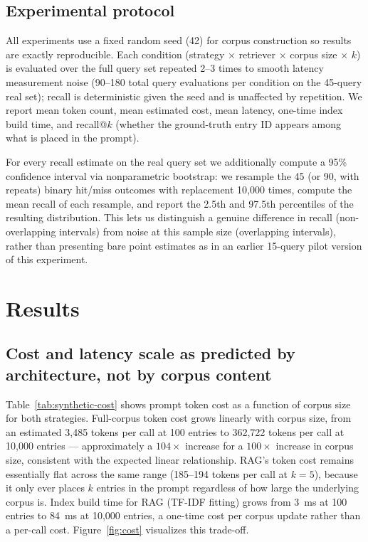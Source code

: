 \documentclass[11pt]{article}
\begin{document}
\subsection{Experimental protocol}

All experiments use a fixed random seed (42) for corpus construction so results are exactly reproducible. Each condition (strategy $\times$ retriever $\times$ corpus size $\times$ $k$) is evaluated over the full query set repeated 2--3 times to smooth latency measurement noise (90--180 total query evaluations per condition on the 45-query real set); recall is deterministic given the seed and is unaffected by repetition. We report mean token count, mean estimated cost, mean latency, one-time index build time, and recall@$k$ (whether the ground-truth entry ID appears among what is placed in the prompt).

For every recall estimate on the real query set we additionally compute a 95\% confidence interval via nonparametric bootstrap: we resample the 45 (or 90, with repeats) binary hit/miss outcomes with replacement 10{,}000 times, compute the mean recall of each resample, and report the 2.5th and 97.5th percentiles of the resulting distribution. This lets us distinguish a genuine difference in recall (non-overlapping intervals) from noise at this sample size (overlapping intervals), rather than presenting bare point estimates as in an earlier 15-query pilot version of this experiment.

\section{Results}

\subsection{Cost and latency scale as predicted by architecture, not by corpus content}

Table~\ref{tab:synthetic-cost} shows prompt token cost as a function of corpus size for both strategies. Full-corpus token cost grows linearly with corpus size, from an estimated 3{,}485 tokens per call at 100 entries to 362{,}722 tokens per call at 10{,}000 entries --- approximately a $104\times$ increase for a $100\times$ increase in corpus size, consistent with the expected linear relationship. RAG's token cost remains essentially flat across the same range (185--194 tokens per call at $k=5$), because it only ever places $k$ entries in the prompt regardless of how large the underlying corpus is. Index build time for RAG (TF-IDF fitting) grows from 3~ms at 100 entries to 84~ms at 10{,}000 entries, a one-time cost per corpus update rather than a per-call cost. Figure~\ref{fig:cost} visualizes this trade-off.
\end{document}
